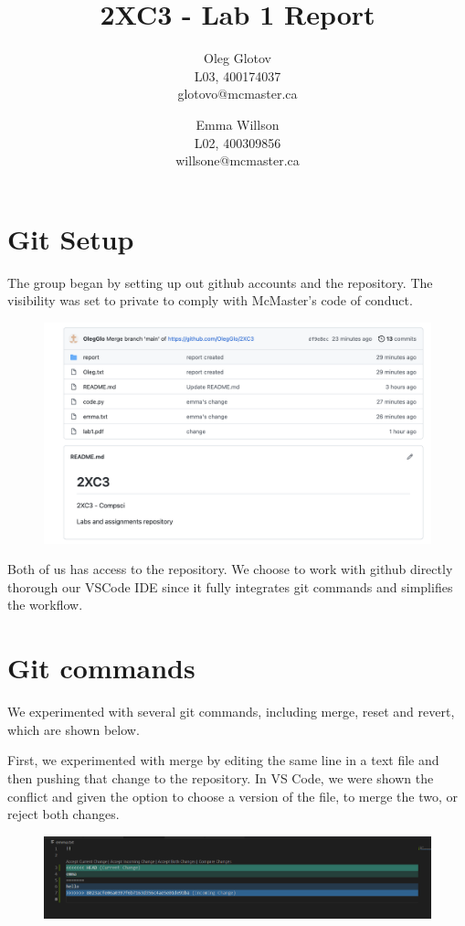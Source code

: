 \documentclass[twocolumn, 10pt]{article}
\title{2XC3 - Lab 1 Report}
\author{Oleg Glotov\\ L03, 400174037\\ glotovo@mcmaster.ca \and Emma Willson\\ L02, 400309856\\ willsone@mcmaster.ca}
\begin{document}
\maketitle
\section{Git Setup}\label{sec:git}
The group began by setting up out github accounts and the repository. The visibility was set to private to comply with McMaster's code of conduct.

\begin{figure}[H]
\includegraphics[width=\linewidth]{img1}
\end{figure}

Both of us has access to the repository. We choose to work with github directly thorough our VSCode IDE since it fully integrates git commands and simplifies the workflow.

\section{Git commands}

We experimented with several git commands, including merge, reset and revert, which are shown below. 

First, we experimented with merge by editing the same line in a text file and then pushing that change to the repository. In VS Code, we were shown the conflict and given the option to choose a version of the file, to merge the two, or reject both changes.

\begin{figure}[H]
\includegraphics[width=\linewidth]{merge}
\end{figure}
\end{document}
